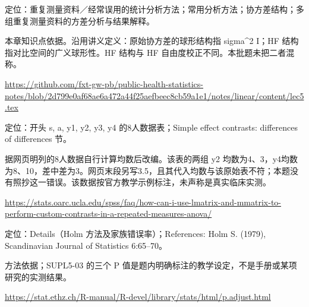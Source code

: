 \par\noindent\begin{minipage}{\linewidth}\label{src:L5-COURSE}
\par
定位：重复测量资料／经常误用的统计分析方法；常用分析方法；协方差结构；多组重复测量资料的方差分析与结果解释。\par
本章知识点依据。沿用讲义定义：原始协方差的球形结构指 sigma\textasciicircum{}2 I；HF 结构指对比空间的广义球形性。HF 结构与 HF 自由度校正不同。本批题未把二者混称。\par
{\small\url{https://github.com/fxt-gw-pb/public-health-statistics-notes/blob/2d799e0af68ae6a472a44f25aefbeec8cb59a1e1/notes/linear/content/lec5.tex}}\par
\end{minipage}\par\medskip

\par\noindent\begin{minipage}{\linewidth}\label{src:L5-UCLA-CONTRAST}
\par
定位：开头 s, a, y1, y2, y3, y4 的8人数据表；Simple effect contrasts: differences of differences 节。\par
据网页明列的8人数据自行计算均数后改编。该表的两组 y2 均数为4、3，y4均数为8、10，差中差为3。网页末段另写3.5，且其代入均数与该原始表不符；本题没有照抄这一错误。该数据按官方教学示例标注，未声称是真实临床实测。\par
{\small\url{https://stats.oarc.ucla.edu/spss/faq/how-can-i-use-lmatrix-and-mmatrix-to-perform-custom-contrasts-in-a-repeated-measures-anova/}}\par
\end{minipage}\par\medskip

\par\noindent\begin{minipage}{\linewidth}\label{src:L5-R-HOLM}
\par
定位：Details（Holm 方法及家族错误率）；References: Holm S. (1979), Scandinavian Journal of Statistics 6:65–70。\par
方法依据；SUPL5-03 的三个 P 值是题内明确标注的教学设定，不是手册或某项研究的实测结果。\par
{\small\url{https://stat.ethz.ch/R-manual/R-devel/library/stats/html/p.adjust.html}}\par
\end{minipage}\par\medskip

